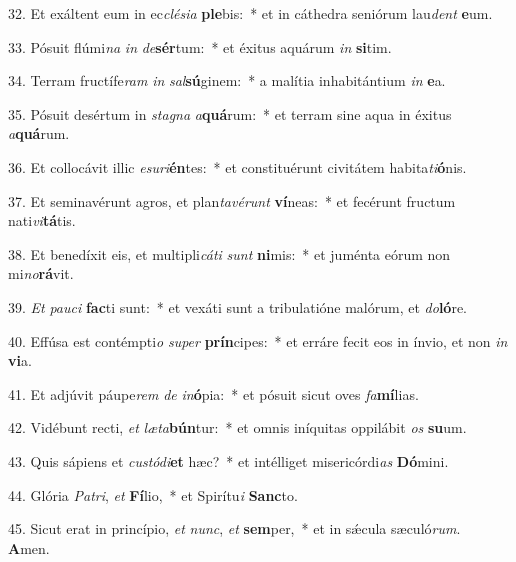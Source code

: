 32. Et exáltent eum in ec\textit{clé}\textit{si}\textit{a} \textbf{ple}bis:~*  et in cáthedra seniórum lau\textit{dent} \textbf{e}um.\

33. Pósuit flúmi\textit{na} \textit{in} \textit{de}\textbf{sér}tum:~*  et éxitus aquárum \textit{in} \textbf{si}tim.\

34. Terram fructífe\textit{ram} \textit{in} \textit{sal}\textbf{sú}ginem:~*  a malítia inhabitántium \textit{in} \textbf{e}a.\

35. Pósuit desértum in \textit{sta}\textit{gna} \textit{a}\textbf{quá}rum:~*  et terram sine aqua in éxitus \textit{a}\textbf{quá}rum.\

36. Et collocávit illic \textit{e}\textit{su}\textit{ri}\textbf{én}tes:~*  et constituérunt civitátem habita\textit{ti}\textbf{ó}nis.\

37. Et seminavérunt agros, et plan\textit{ta}\textit{vé}\textit{runt} \textbf{ví}neas:~*  et fecérunt fructum nati\textit{vi}\textbf{tá}tis.\

38. Et benedíxit eis, et multipli\textit{cá}\textit{ti} \textit{sunt} \textbf{ni}mis:~*  et juménta eórum non mi\textit{no}\textbf{rá}vit.\

39. \textit{Et} \textit{pau}\textit{ci} \textbf{fac}ti sunt:~*  et vexáti sunt a tribulatióne malórum, et \textit{do}\textbf{ló}re.\

40. Effúsa est contémpti\textit{o} \textit{su}\textit{per} \textbf{prín}cipes:~*  et erráre fecit eos in ínvio, et non \textit{in} \textbf{vi}a.\

41. Et adjúvit páupe\textit{rem} \textit{de} \textit{in}\textbf{ó}pia:~*  et pósuit sicut oves \textit{fa}\textbf{mí}lias.\

42. Vidébunt recti, \textit{et} \textit{læ}\textit{ta}\textbf{bún}tur:~*  et omnis iníquitas oppilábit \textit{os} \textbf{su}um.\

43. Quis sápiens et \textit{cus}\textit{tó}\textit{di}\textbf{et} hæc?~*  et intélliget misericórdi\textit{as} \textbf{Dó}mini.\

44. Glória \textit{Pa}\textit{tri}, \textit{et} \textbf{Fí}lio,~*  et Spirítu\textit{i} \textbf{Sanc}to.\

45. Sicut erat in princípio, \textit{et} \textit{nunc}, \textit{et} \textbf{sem}per,~*  et in sǽcula sæculó\textit{rum}. \textbf{A}men.\

